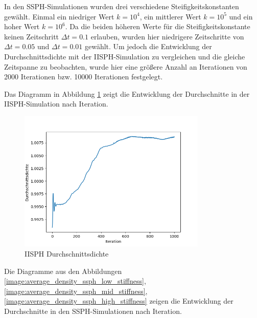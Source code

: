 \documentclass{scrreprt}
\begin{document}
In den SSPH-Simulationen wurden drei verschiedene Steifigkeitskonstanten gewählt.
Einmal ein niedriger Wert $k = 10^4$, ein mittlerer Wert $k = 10^5$ und ein hoher Wert $k = 10^6$.
Da die beiden höheren Werte für die Steifigkeitskonstante keinen Zeitschritt $\Delta t = 0.1$ erlauben, wurden hier niedrigere Zeitschritte von $\Delta t = 0.05$
und $\Delta t = 0.01$ gewählt.
Um jedoch die Entwicklung der Durchschnittsdichte mit der IISPH-Simulation zu vergleichen und die gleiche Zeitspanne zu beobachten,
wurde hier eine größere Anzahl an Iterationen von 2000 Iterationen bzw. 10000 Iterationen festgelegt.

Das Diagramm in Abbildung \ref{image:average_density_iisph} zeigt die Entwicklung der Durchschnitte in der IISPH-Simulation nach Iteration.

\begin{figure}[htb]
    \includegraphics[width=0.8\textwidth]{average_density_iisph.png}
    \caption{IISPH Durchschnittsdichte}
    \label{image:average_density_iisph}
\end{figure}

Die Diagramme aus den Abbildungen \ref{image:average_density_ssph_low_stiffness}, \ref{image:average_density_ssph_mid_stiffness}, \ref{image:average_density_ssph_high_stiffness}
zeigen die Entwicklung der Durchschnitte in den SSPH-Simulationen nach Iteration.
\end{document}
